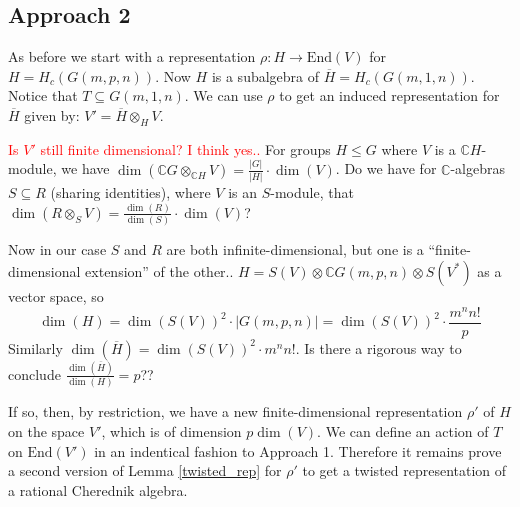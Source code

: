\documentclass[11pt]{article}
\newcommand{\bb}{\medbreak}
\newcommand{\nt}{\noindent}
\newcommand{\Cc}{\mathbb{C}}
\newcommand{\rt}{\xrightarrow{}}
\newcommand{\End}{\text{End}}
\theoremstyle{definition}
\begin{document}

\subsection{Approach 2}
As before we start with a representation $\rho:H\rt \End(V)$ for $H=H_c(G(m,p,n))$. Now $H$ is a subalgebra of $\overline{H}=H_c(G(m,1,n))$. Notice that $T\subseteq G(m,1,n)$. We can use $\rho$ to get an induced representation for $\overline{H}$ given by: $V'=\overline{H}\otimes_H V$.\bb

\nt \textcolor{red}{Is $V'$ still finite dimensional? I think yes..} For groups $H\leq G$ where $V$ is a $\Cc H$-module, we have $\dim(\Cc G\otimes_{\Cc H}V)=\frac{|G|}{|H|}\cdot \dim(V)$. Do we have for $\Cc$-algebras $S\subseteq R$ (sharing identities), where $V$ is an $S$-module, that $\dim(R\otimes_S V)=\frac{\dim(R)}{\dim(S)}\cdot \dim(V)$?\bb

\nt Now in our case $S$ and $R$ are both infinite-dimensional, but one is a ``finite-dimensional extension'' of the other.. $H=S(V)\otimes \Cc G(m,p,n)\otimes S(V^*)$ as a vector space, so 
$$\dim(H)=\dim(S(V))^2\cdot |G(m,p,n)|=\dim(S(V))^2\cdot \frac{m^n n!}{p}$$ Similarly $\dim(\overline{H})=\dim(S(V))^2\cdot m^n n!$. Is there a rigorous way to conclude $\frac{\dim(\overline{H})}{\dim(H)}=p$??\bb

\nt If so, then, by restriction, we have a new finite-dimensional representation $\rho'$ of $H$ on the space $V'$, which is of dimension $p\dim(V)$. We can define an action of $T$ on $\End(V')$ in an indentical fashion to Approach 1. Therefore it remains prove a second version of Lemma \ref{twisted_rep} for $\rho'$ to get a twisted representation of a rational Cherednik algebra.




\end{document}
